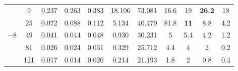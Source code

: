 \begin{table}[hbt]
\begin{tabular}{cc|SSSSS|SSSS}
		\cmidrule(r){1-7}
		\cmidrule(r){8-11}										
		&   9    	&  	  0.237  	&	  0.263  	&	  0.383  	&	  18.106  	&	  73.081  	&	 16.6 	&	 19 		&  \bfseries 26.2  &	 18  \\
		&   25   	&  	  0.072  	&	  0.088  	&	  0.112  	&	  5.134   	&	  40.479  	&	 81.8 	&    \bfseries 11 &	 8.8 		&	 4.2  \\
		&   49   	&  	  0.041  	&	  0.044  	&	  0.048  	&	  0.930   	&	  30.231  	&	 5 	    &	 5.4 		&	 4.2 		&	 1.2  \\
		&   81   	&  	  0.026  	&	  0.024  	&	  0.031  	&	  0.329   	&	  25.712  	&	 4.4 	&	 4 		    &	 2 		    &	 0.2  \\
		&   121  	&  	  0.017  	&	  0.014  	&	  0.020  	&	  0.214   	&	  21.193  	&	 1.8  	&	 2 		    &	 0.8 		&	 0.4  \\
		\bottomrule
	\end{tabular}																		
\end{table}	

